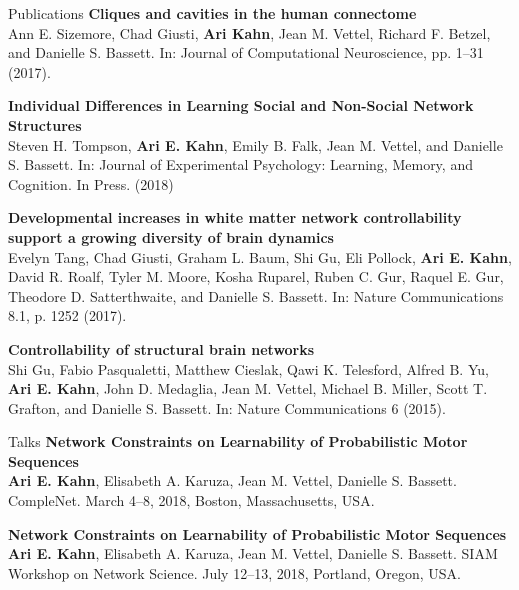 \documentclass{resume} %
\begin{document}
\begin{rSection}{Publications}
\textbf{Cliques and cavities in the human connectome} \\
Ann E. Sizemore, Chad Giusti, \textbf{Ari Kahn}, Jean M. Vettel, Richard F. Betzel, and Danielle S. Bassett. In: Journal of Computational Neuroscience, pp. 1–31 (2017).

\textbf{Individual Differences in Learning Social and Non-Social Network Structures} \\
Steven H. Tompson, \textbf{Ari E. Kahn}, Emily B. Falk, Jean M. Vettel, and Danielle S. Bassett. In: Journal of Experimental Psychology: Learning, Memory, and Cognition. In Press. (2018)

\textbf{Developmental increases in white matter network controllability support a growing diversity of brain dynamics} \\
Evelyn Tang, Chad Giusti, Graham L. Baum, Shi Gu, Eli Pollock, \textbf{Ari E. Kahn}, David R. Roalf, Tyler M. Moore, Kosha Ruparel, Ruben C. Gur, Raquel E. Gur, Theodore D. Satterthwaite, and Danielle S. Bassett. In: Nature Communications 8.1, p. 1252 (2017).



\textbf{Controllability of structural brain networks} \\
Shi Gu, Fabio Pasqualetti, Matthew Cieslak, Qawi K. Telesford, Alfred B. Yu, \textbf{Ari E. Kahn}, John D. Medaglia, Jean M. Vettel, Michael B. Miller, Scott T. Grafton, and Danielle S. Bassett. In: Nature Communications 6 (2015).

\end{rSection}


\begin{rSection}{Talks}
\textbf{Network Constraints on Learnability of Probabilistic Motor Sequences} \\
\textbf{Ari E. Kahn}, Elisabeth A. Karuza, Jean M. Vettel, Danielle S. Bassett.
CompleNet. March 4--8, 2018, Boston, Massachusetts, USA.

\textbf{Network Constraints on Learnability of Probabilistic Motor Sequences} \\
\textbf{Ari E. Kahn}, Elisabeth A. Karuza, Jean M. Vettel, Danielle S. Bassett.
SIAM Workshop on Network Science. July 12--13, 2018, Portland, Oregon, USA.
\end{rSection}
\end{document}
